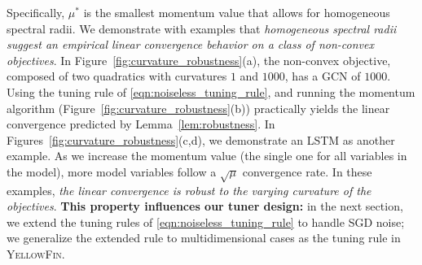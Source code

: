 \documentclass{article} %
\newcommand{\mat}[1]{\bm{\mathit{#1}}}
\newcommand{\tuner}{\textsc{YellowFin}\xspace}
\begin{document}
Specifically, $\mu^*$ is the smallest momentum value that allows for homogeneous spectral radii.
We demonstrate with examples that \emph{homogeneous spectral radii suggest an empirical linear convergence behavior on a class of non-convex objectives}. In Figure~\ref{fig:curvature_robustness}(a), the non-convex objective,
composed of two quadratics with curvatures $1$ and $1000$, has a GCN of $1000$.
Using the tuning rule of \eqref{eqn:noiseless_tuning_rule}, and running the momentum algorithm (Figure~\ref{fig:curvature_robustness}(b)) practically yields the linear convergence predicted by Lemma~\ref{lem:robustness}.
In Figures~\ref{fig:curvature_robustness}(c,d), we demonstrate an LSTM as another example. As we increase the momentum value (the single one for all variables in the model), more model variables follow a $\sqrt{\mu}$ convergence rate.
In these examples, \emph{the linear convergence is robust to the varying curvature of the objectives}. \textbf{This property influences our tuner design:}
{in the next section, we extend the tuning rules of \eqref{eqn:noiseless_tuning_rule} to handle SGD noise; 
we generalize the extended rule to multidimensional cases as the tuning rule in \tuner}.
\end{document}
